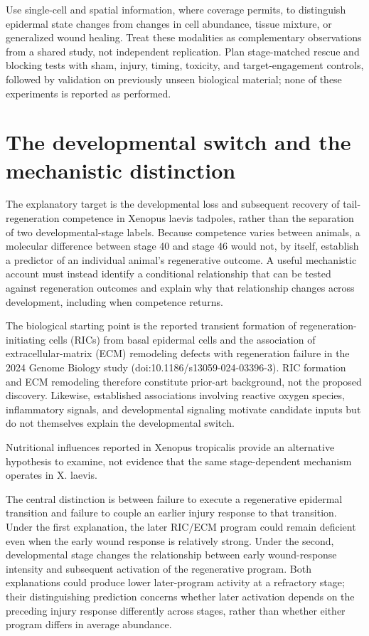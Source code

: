 \documentclass[11pt]{article}
\begin{document}
Use single-cell and spatial information, where coverage permits, to distinguish epidermal state changes from changes in cell abundance, tissue mixture, or generalized wound healing. Treat these modalities as complementary observations from a shared study, not independent replication. Plan stage-matched rescue and blocking tests with sham, injury, timing, toxicity, and target-engagement controls, followed by validation on previously unseen biological material; none of these experiments is reported as performed.

\section{The developmental switch and the mechanistic distinction}
The explanatory target is the developmental loss and subsequent recovery of tail-regeneration competence in Xenopus laevis tadpoles, rather than the separation of two developmental-stage labels. Because competence varies between animals, a molecular difference between stage 40 and stage 46 would not, by itself, establish a predictor of an individual animal’s regenerative outcome. A useful mechanistic account must instead identify a conditional relationship that can be tested against regeneration outcomes and explain why that relationship changes across development, including when competence returns.

The biological starting point is the reported transient formation of regeneration-initiating cells (RICs) from basal epidermal cells and the association of extracellular-matrix (ECM) remodeling defects with regeneration failure in the 2024 Genome Biology study (doi:10.1186/s13059-024-03396-3). RIC formation and ECM remodeling therefore constitute prior-art background, not the proposed discovery. Likewise, established associations involving reactive oxygen species, inflammatory signals, and developmental signaling motivate candidate inputs but do not themselves explain the developmental switch.

Nutritional influences reported in Xenopus tropicalis provide an alternative hypothesis to examine, not evidence that the same stage-dependent mechanism operates in X. laevis.

The central distinction is between failure to execute a regenerative epidermal transition and failure to couple an earlier injury response to that transition. Under the first explanation, the later RIC/ECM program could remain deficient even when the early wound response is relatively strong. Under the second, developmental stage changes the relationship between early wound-response intensity and subsequent activation of the regenerative program. Both explanations could produce lower later-program activity at a refractory stage; their distinguishing prediction concerns whether later activation depends on the preceding injury response differently across stages, rather than whether either program differs in average abundance.
\end{document}
